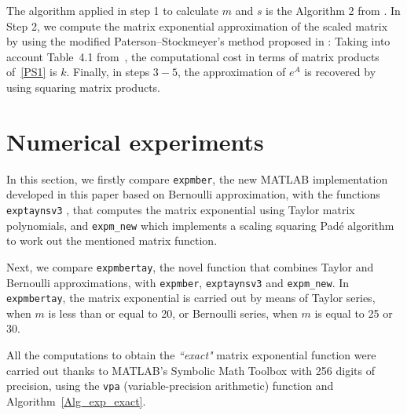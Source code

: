 \documentclass[preprint,10pt,numbers,sort&compress]{elsarticle}
\begin{document}
The algorithm applied in step 1 to calculate $m$ and $s$ is the Algorithm 2 from \cite{RSID16}. In Step 2, we compute the matrix exponential
approximation of the scaled matrix by using the modified Paterson--Stockmeyer's method proposed in \cite[p.
1836-1837]{SIDR11b}:
{\setlength{}
}
Taking into account Table~4.1 from~\cite{High08}, the computational cost in terms of matrix products of~\eqref{PS1} is $k$. 
Finally, in steps $3-5$, the approximation of $e^{A}$ is recovered by using squaring matrix products.
  
\section{Numerical experiments}\label{sec:tests}
In this section, we firstly compare \texttt{expmber}, the new MATLAB implementation developed in this paper based on Bernoulli approximation, with the functions \texttt{exptaynsv3} \cite{RSID16}, that computes the matrix exponential using Taylor matrix polynomials, and \texttt{expm\_new} \cite{AlHi09} which implements a scaling squaring Pad\'e algorithm to work out the mentioned matrix function. 

Next, we compare \texttt{expmbertay}, the novel function that combines Taylor and Bernoulli approximations, with \texttt{expmber}, \texttt{exptaynsv3} and \texttt{expm\_new}. In \texttt{expmbertay}, the matrix exponential is carried out by means of Taylor series, when $m$ is less than or equal to 20, or Bernoulli series, when $m$ is equal to 25 or 30.

All the computations to obtain the {\it``exact"} matrix exponential function were carried out thanks to MATLAB's Symbolic Math Toolbox with 256 digits of precision, using the \texttt{vpa} (variable-precision arithmetic) function and Algorithm~\ref{Alg_exp_exact}.
\end{document}
